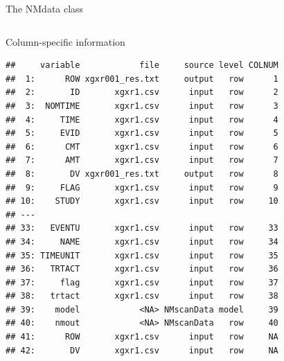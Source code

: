 \documentclass[
  8pt,
  ignorenonframetext,
  aspectratio=169]{beamer}
\begin{document}
\begin{frame}[fragile]{The NMdata class}
\begin{columns}[T]
\begin{column}{0.48\textwidth}
\begin{block}{Column-specific information}
\begin{verbatim}
##     variable            file     source level COLNUM
##  1:      ROW xgxr001_res.txt     output   row      1
##  2:       ID       xgxr1.csv      input   row      2
##  3:  NOMTIME       xgxr1.csv      input   row      3
##  4:     TIME       xgxr1.csv      input   row      4
##  5:     EVID       xgxr1.csv      input   row      5
##  6:      CMT       xgxr1.csv      input   row      6
##  7:      AMT       xgxr1.csv      input   row      7
##  8:       DV xgxr001_res.txt     output   row      8
##  9:     FLAG       xgxr1.csv      input   row      9
## 10:    STUDY       xgxr1.csv      input   row     10
## ---                                                 
## 33:   EVENTU       xgxr1.csv      input   row     33
## 34:     NAME       xgxr1.csv      input   row     34
## 35: TIMEUNIT       xgxr1.csv      input   row     35
## 36:   TRTACT       xgxr1.csv      input   row     36
## 37:     flag       xgxr1.csv      input   row     37
## 38:   trtact       xgxr1.csv      input   row     38
## 39:    model            <NA> NMscanData model     39
## 40:    nmout            <NA> NMscanData   row     40
## 41:      ROW       xgxr1.csv      input   row     NA
## 42:       DV       xgxr1.csv      input   row     NA
\end{verbatim}
\end{block}
\end{column}
\end{columns}
\end{frame}
\end{document}
